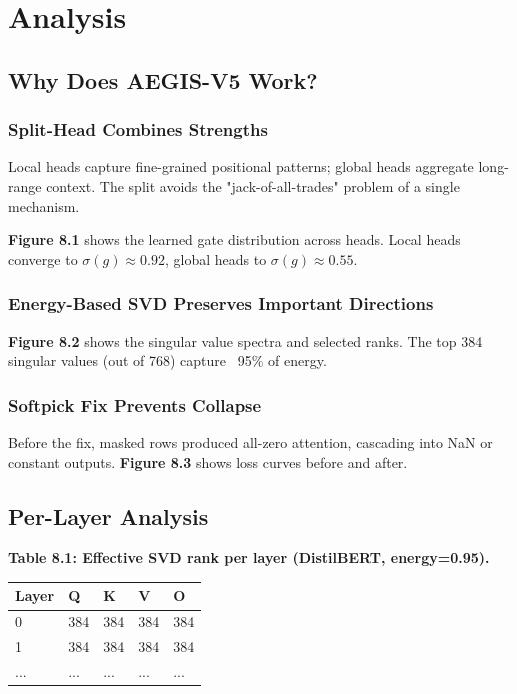 \section{Analysis}

\subsection{Why Does AEGIS-V5 Work?}

\subsubsection{Split-Head Combines Strengths}

Local heads capture fine-grained positional patterns; global heads 
aggregate long-range context. The split avoids the "jack-of-all-trades" 
problem of a single mechanism.

\textbf{Figure 8.1} shows the learned gate distribution across heads. Local 
heads converge to $\sigma(g) \approx 0.92$, global heads to 
$\sigma(g) \approx 0.55$.

\subsubsection{Energy-Based SVD Preserves Important Directions}

\textbf{Figure 8.2} shows the singular value spectra and selected ranks. The 
top 384 singular values (out of 768) capture ~95\% of energy.

\subsubsection{Softpick Fix Prevents Collapse}

Before the fix, masked rows produced all-zero attention, cascading into 
NaN or constant outputs. \textbf{Figure 8.3} shows loss curves before and after.

\subsection{Per-Layer Analysis}

\textbf{Table 8.1: Effective SVD rank per layer (DistilBERT, energy=0.95).}

\begin{table}[H]
\centering
\small
\begin{tabular}{lllll}
\toprule
\textbf{Layer} & \textbf{Q} & \textbf{K} & \textbf{V} & \textbf{O} \\
\midrule
0 & 384 & 384 & 384 & 384 \\
1 & 384 & 384 & 384 & 384 \\
... & ... & ... & ... & ... \\
\bottomrule
\end{tabular}
\end{table}

